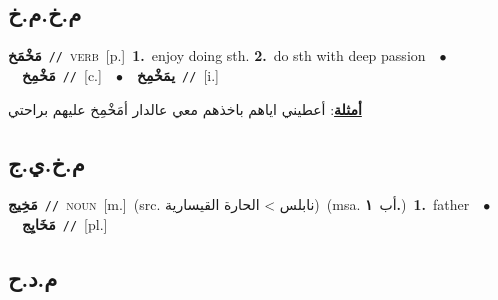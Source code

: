 \documentclass[10pt,a4paper,twoside]{article} %
\begin{document}
\begin{multicols}{2}
\vspace{-3mm}
\subsection*{\color{blue}\foreignlanguage{arabic}{م.خ.م.خ}\color{blue}{}} 

{\setlength\topsep{0pt}\textbf{\foreignlanguage{arabic}{مَخْمَخ}}\ {\color{gray}\texttt{//}\color{black}}\ \textsc{verb}\ [p.]\ \textbf{1.}~enjoy doing sth.  \textbf{2.}~do sth with deep passion\ \ $\bullet$\ \ \setlength\topsep{0pt}\textbf{\foreignlanguage{arabic}{مَخْمِخ}}\ {\color{gray}\texttt{//}\color{black}}\ [c.]\ \ $\bullet$\ \ \setlength\topsep{0pt}\textbf{\foreignlanguage{arabic}{يمَخْمِخ}}\ {\color{gray}\texttt{//}\color{black}}\ [i.]\  \begin{flushright}\color{gray}\foreignlanguage{arabic}{\textbf{\underline{\foreignlanguage{arabic}{أمثلة}}}: أعطيني اياهم باخذهم معي عالدار أمَخْمِخ عليهم براحتي}\end{flushright}\color{black}} \vspace{2mm}

\vspace{-3mm}
\subsection*{\color{blue}\foreignlanguage{arabic}{م.خ.ي.ج}\color{blue}{}} 

{\setlength\topsep{0pt}\textbf{\foreignlanguage{arabic}{مَخِيج}}\ {\color{gray}\texttt{//}\color{black}}\ \textsc{noun}\ [m.]\ (src. \color{gray}\foreignlanguage{arabic}{نابلس > الحارة القيسارية}\color{black})\ \color{gray}(msa. \foreignlanguage{arabic}{أب}~\foreignlanguage{arabic}{\textbf{١.}})\color{black}\ \textbf{1.}~father\ \ $\bullet$\ \ \setlength\topsep{0pt}\textbf{\foreignlanguage{arabic}{مَخَايِج}}\ {\color{gray}\texttt{//}\color{black}}\ [pl.]\ } \vspace{2mm}

\vspace{-3mm}
\subsection*{\color{blue}\foreignlanguage{arabic}{م.د.ح}\color{blue}{}} 


\end{multicols}
\end{document}
